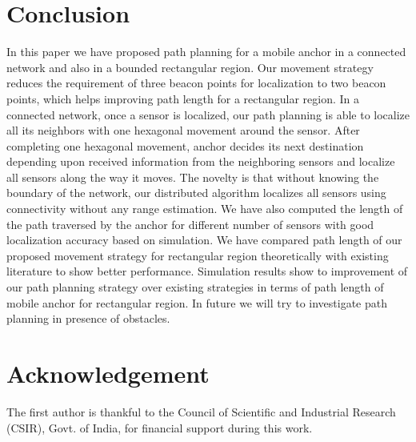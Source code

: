 \documentclass[preprint,11pt]{elsarticle}
\begin{document}
\section{Conclusion}
In this paper we have proposed path planning for a mobile anchor in a connected network and also in a bounded rectangular region.
Our movement strategy reduces the requirement of three beacon points for localization to two beacon points, which helps improving
path length for a rectangular region.
In a connected network, once a sensor is localized, our path planning is able to localize all its neighbors
with one hexagonal movement around the sensor. After completing one hexagonal movement, anchor decides its next
destination depending upon received information from the neighboring sensors and localize all sensors along
the way it moves. The novelty is that without knowing the boundary of the network,
our distributed algorithm localizes all sensors using connectivity without any range estimation.
We have also computed the length of the path traversed by the anchor for different number of sensors with good
localization accuracy based on simulation.
We have compared path length of our proposed movement strategy for rectangular region theoretically with existing
literature to show better performance. Simulation results show  to  improvement of our path
planning strategy over existing strategies in terms of path length of mobile anchor for rectangular region.
In future we will try to investigate path planning in presence of obstacles.
\label{sec:conclusion}

\section*{Acknowledgement}
The first author is thankful to the Council of Scientific and Industrial Research (CSIR), Govt. of India,
for financial support during this work.



\end{document}
